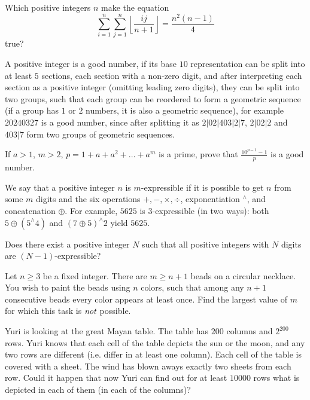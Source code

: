 \documentclass[11pt]{scrartcl}
\begin{document}
\begin{problem}[819328919046836]
Which positive integers $n$ make the equation\[\sum_{i=1}^n \sum_{j=1}^n \left\lfloor \frac{ij}{n+1} \right\rfloor=\frac{n^2(n-1)}{4}\]true?
\end{problem}
\begin{problem}[821703118093628]
A positive integer is a good number, if its base $10$ representation can be split into at least $5$ sections, each section with a non-zero digit, and after interpreting each section as a positive integer (omitting leading zero digits), they can be split into two groups, such that each group can be reordered to form a geometric sequence (if a group has $1$ or $2$ numbers, it is also a geometric sequence), for example $20240327$ is a good number, since after splitting it as $2|02|403|2|7$, $2|02|2$ and $403|7$ form two groups of geometric sequences.

If $a>1$, $m>2$, $p=1+a+a^2+\dots+a^m$ is a prime, prove that $\frac{10^{p-1}-1}{p}$ is a good number.
\end{problem}
\begin{problem}[822507508246664]
	We say that a positive integer $n$ is $m$-expressible if it is possible to get $n$ from some $m$ digits and the six operations $+,-,\times,\div$, exponentiation $^\wedge$, and concatenation $\oplus$. For example, $5625$ is $3$-expressible (in two ways): both $5\oplus (5^\wedge 4)$ and $(7\oplus 5)^\wedge 2$ yield $5625$.

Does there exist a positive integer $N$ such that all positive integers with $N$ digits are $(N-1)$-expressible?
\end{problem}
\begin{problem}[822921222405372]
Let $n\ge 3$ be a fixed integer. There are $m\ge n+1$ beads on a circular necklace. You wish to paint the beads using $n$ colors, such that among any $n+1$ consecutive beads every color appears at least once. Find the largest value of $m$ for which this task is $\emph{not}$ possible.
\end{problem}
\begin{problem}[825542457780626]
Yuri is looking at the great Mayan table. The table has $200$ columns and $2^{200}$ rows. Yuri knows that each cell of the table depicts the sun or the moon, and any two rows are different (i.e. differ in at least one column). Each cell of the table is covered with a sheet. The wind has blown aways exactly two sheets from each row. Could it happen that now Yuri can find out for at least $10000$ rows what is depicted in each of them (in each of the columns)?
\end{problem}
\end{document}
